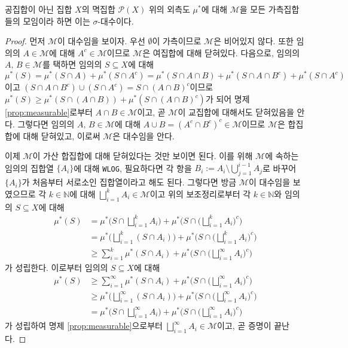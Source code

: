 \begin{theorem}
    공집합이 아닌 집합 $X$의 멱집합 $\mathcal{P}(X)$ 위의 외측도 $\mu^*$에 대해 $\mathcal{M}$을 모든 가측집합들의 모임이라 하면 이는 $\sigma$-대수이다.
\end{theorem}

\begin{proof}
    먼저 $\mathcal{M}$이 대수임을 보이자. 우선 $\emptyset$이 가측이므로 $\mathcal{M}$은 비어있지 않다. 또한 임의의 $A\in\mathcal{M}$에 대해 $A^c\in\mathcal{M}$이므로 $\mathcal{M}$은 여집합에 대해 닫혀있다. 다음으로, 임의의 $A,\,B\in\mathcal{M}$를 택하면 임의의 $S\subseteq X$에 대해 $\mu^*(S)=\mu^*(S\cap A)+\mu^*(S\cap A^c)=\mu^*(S\cap A\cap B)+\mu^*(S\cap A\cap B^c)+\mu^*(S\cap A^c)$이고 $(S\cap A\cap B^c)\cup(S\cap A^c)=S\cap(A\cap B)^c$이므로 $\mu^*(S)\geq\mu^*(S\cap(A\cap B))+\mu^*(S\cap(A\cap B)^c)$가 되어 명제 \ref{prop:measurable}로부터 $A\cap B\in\mathcal{M}$이고, 곧 $\mathcal{M}$이 교집합에 대해서도 닫혀있음을 안다. 그렇다면 임의의 $A,\,B\in\mathcal{M}$에 대해 $A\cup B=(A^c\cap B^c)^c\in\mathcal{M}$이므로 $\mathcal{M}$은 합집합에 대해 닫혀있고, 이로써 $\mathcal{M}$은 대수임을 안다.

    이제 $\mathcal{M}$이 가산 합집합에 대해 닫혀있다는 것만 보이면 된다. 이를 위해 $\mathcal{M}$에 속하는 임의의 집합열 $\{A_i\}$에 대해 \texttt{WLOG}, 필요하다면 각 항을 $B_i:=A_i\setminus\bigcup_{j=1}^{i-1}A_j$로 바꾸어 $\{A_i\}$가 처음부터 서로소인 집합열이라고 해도 된다. 그렇다면 방금 $\mathcal{M}$이 대수임을 보였으므로 각 $k\in\mathbb{N}$에 대해 $\bigsqcup_{i=1}^kA_i\in\mathcal{M}$이고 위의 보조정리로부터 각 $k\in\mathbb{N}$와 임의의 $S\subseteq X$에 대해
    \begin{align*}
        \mu^*(S)&=\mu^*\bigg(S\cap\bigsqcup_{i=1}^kA_i\bigg)+\mu^*\bigg(S\cap\bigg(\bigsqcup_{i=1}^kA_i\bigg)^c\bigg)\\
        &=\mu^*\bigg(\bigsqcup_{i=1}^k(S\cap A_i)\bigg)+\mu^*\bigg(S\cap\bigg(\bigsqcup_{i=1}^kA_i\bigg)^c\bigg)\\
        &\geq\sum_{i=1}^k\mu^*(S\cap A_i)+\mu^*\bigg(S\cap\bigg(\bigsqcup_{i=1}^\infty A_i\bigg)^c\bigg)
    \end{align*}
    가 성립한다. 이로부터 임의의 $S\subseteq X$에 대해
    \begin{align*}
        \mu^*(S)&\geq\sum_{i=1}^\infty\mu^*(S\cap A_i)+\mu^*\bigg(S\cap\bigg(\bigsqcup_{i=1}^\infty A_i\bigg)^c\bigg)\\
        &\geq\mu^*\bigg(\bigsqcup_{i=1}^\infty(S\cap A_i)\bigg)+\mu^*\bigg(S\cap\bigg(\bigsqcup_{i=1}^\infty A_i\bigg)^c\bigg)\\
        &=\mu^*\bigg(S\cap\bigsqcup_{i=1}^\infty A_i\bigg)+\mu^*\bigg(S\cap\bigg(\bigsqcup_{i=1}^\infty A_i\bigg)^c\bigg)
    \end{align*}
    가 성립하여 명제 \ref{prop:measurable}으로부터 $\bigsqcup_{i=1}^\infty A_i\in\mathcal{M}$이고, 곧 증명이 끝난다.
\end{proof}

